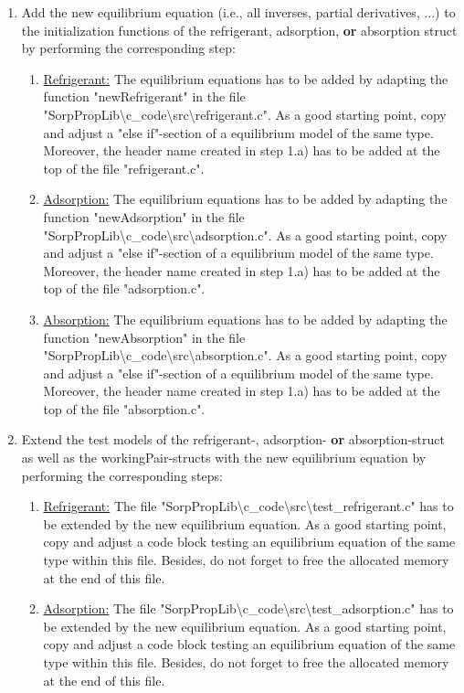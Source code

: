 \begin{enumerate}
\begin{enumerate}
	\end{enumerate}
	\item Add the new equilibrium equation (i.e., all inverses, partial derivatives, ...) to the initialization functions of the refrigerant, adsorption, \textbf{or} absorption struct by performing the corresponding step:
	\begin{enumerate}
		\item \underline{Refrigerant:} The equilibrium equations has to be added by adapting the function "newRefrigerant" in the file "SorpPropLib\textbackslash c\_code\textbackslash src\textbackslash refrigerant.c". As a good starting point, copy and adjust a "else if"-section of a equilibrium model of the same type. Moreover, the header name created in step 1.a) has to be added at the top of the file "refrigerant.c".
		\item \underline{Adsorption:} The equilibrium equations has to be added by adapting the function "newAdsorption" in the file "SorpPropLib\textbackslash c\_code\textbackslash src\textbackslash adsorption.c". As a good starting point, copy and adjust a "else if"-section of a equilibrium model of the same type. Moreover, the header name created in step 1.a) has to be added at the top of the file "adsorption.c".
		\item \underline{Absorption:} The equilibrium equations has to be added by adapting the function "newAbsorption" in the file "SorpPropLib\textbackslash c\_code\textbackslash src\textbackslash absorption.c". As a good starting point, copy and adjust a "else if"-section of a equilibrium model of the same type. Moreover, the header name created in step 1.a) has to be added at the top of the file "absorption.c".
	\end{enumerate}
	\item Extend the test models of the refrigerant-, adsorption- \textbf{or} absorption-struct as well as the workingPair-structs with the new equilibrium equation by performing the corresponding steps:
	\begin{enumerate}
		\item \underline{Refrigerant:} The file "SorpPropLib\textbackslash c\_code\textbackslash src\textbackslash test\_refrigerant.c" has to be extended by the new equilibrium equation. As a good starting point, copy and adjust a code block testing an equilibrium equation of the same type within this file. Besides, do not forget to free the allocated memory at the end of this file.
		\item \underline{Adsorption:} The file "SorpPropLib\textbackslash c\_code\textbackslash src\textbackslash test\_adsorption.c" has to be extended by the new equilibrium equation. As a good starting point, copy and adjust a code block testing an equilibrium equation of the same type within this file. Besides, do not forget to free the allocated memory at the end of this file.

\end{enumerate}
\end{enumerate}
